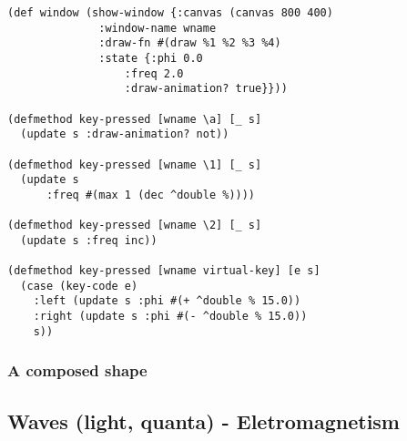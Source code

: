 \documentclass[11pt]{article}
\begin{document}
\begin{verbatim}
(def window (show-window {:canvas (canvas 800 400)
			  :window-name wname
			  :draw-fn #(draw %1 %2 %3 %4)
			  :state {:phi 0.0
				  :freq 2.0
				  :draw-animation? true}}))

(defmethod key-pressed [wname \a] [_ s]
  (update s :draw-animation? not))

(defmethod key-pressed [wname \1] [_ s]
  (update s
	  :freq #(max 1 (dec ^double %))))

(defmethod key-pressed [wname \2] [_ s]
  (update s :freq inc))

(defmethod key-pressed [wname virtual-key] [e s]
  (case (key-code e)
    :left (update s :phi #(+ ^double % 15.0))
    :right (update s :phi #(- ^double % 15.0))
    s))
\end{verbatim}

\subsubsection{A composed shape}
\label{sec:org819b2f3}

\subsection{Waves (light, quanta) - Eletromagnetism}
\label{sec:org49f2e35}
\end{document}
